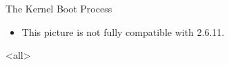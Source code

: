 \begin{frame}{The Kernel Boot Process}
  \begin{center}
  \end{center}
\end{frame}

\begin{itemize}
\item This picture is not fully compatible with 2.6.11.
\end{itemize}



\mode<all>
